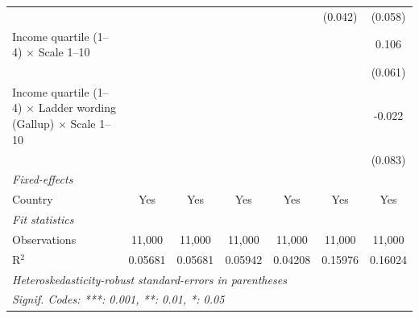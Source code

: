 \begin{tabular}{lcccccc}
                                                                                  &                &                &                &                & (0.042)        & (0.058)\\   
   Income quartile (1--4) $\times$ Scale 1--10                                    &                &                &                &                &                & 0.106\\   
                                                                                  &                &                &                &                &                & (0.061)\\   
   Income quartile (1--4) $\times$ Ladder wording (Gallup) $\times$ Scale 1--10   &                &                &                &                &                & -0.022\\   
                                                                                  &                &                &                &                &                & (0.083)\\   
   \midrule
   \emph{Fixed-effects}\\
   Country                                                                        & Yes            & Yes            & Yes            & Yes            & Yes            & Yes\\  
   \midrule
   \emph{Fit statistics}\\
   Observations                                                                   & 11,000         & 11,000         & 11,000         & 11,000         & 11,000         & 11,000\\  
   R$^2$                                                                          & 0.05681        & 0.05681        & 0.05942        & 0.04208        & 0.15976        & 0.16024\\  
   \midrule \midrule
   \multicolumn{7}{l}{\emph{Heteroskedasticity-robust standard-errors in parentheses}}\\
   \multicolumn{7}{l}{\emph{Signif. Codes: ***: 0.001, **: 0.01, *: 0.05}}\\
\end{tabular}
\par\endgroup


